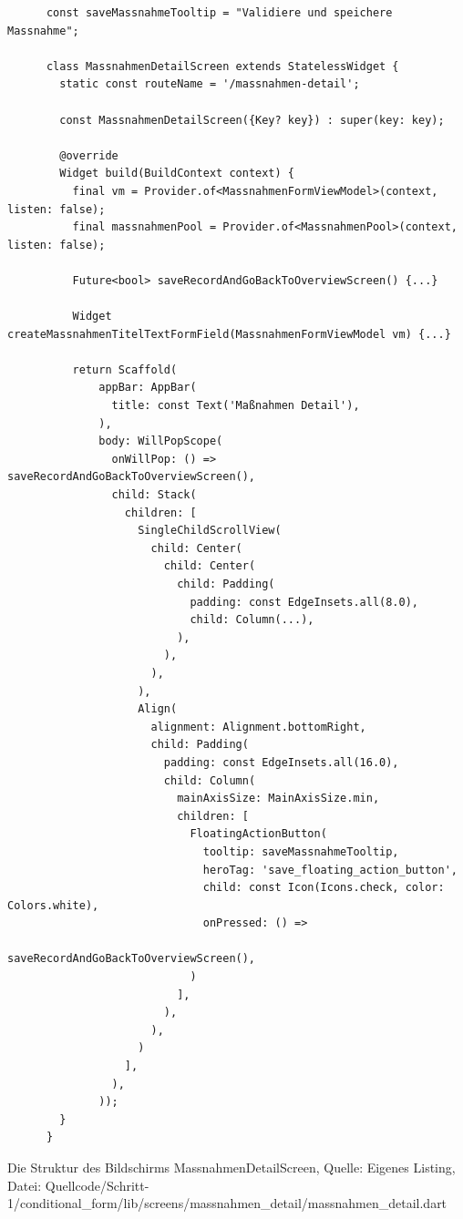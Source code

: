 \begin{listing}[htbp]
    \begin{verbatim}
      const saveMassnahmeTooltip = "Validiere und speichere Massnahme";

      class MassnahmenDetailScreen extends StatelessWidget {
        static const routeName = '/massnahmen-detail';
      
        const MassnahmenDetailScreen({Key? key}) : super(key: key);
      
        @override
        Widget build(BuildContext context) {
          final vm = Provider.of<MassnahmenFormViewModel>(context, listen: false);
          final massnahmenPool = Provider.of<MassnahmenPool>(context, listen: false);
      
          Future<bool> saveRecordAndGoBackToOverviewScreen() {...}
      
          Widget createMassnahmenTitelTextFormField(MassnahmenFormViewModel vm) {...}
      
          return Scaffold(
              appBar: AppBar(
                title: const Text('Maßnahmen Detail'),
              ),
              body: WillPopScope(
                onWillPop: () => saveRecordAndGoBackToOverviewScreen(),
                child: Stack(
                  children: [
                    SingleChildScrollView(
                      child: Center(
                        child: Center(
                          child: Padding(
                            padding: const EdgeInsets.all(8.0),
                            child: Column(...),
                          ),
                        ),
                      ),
                    ),
                    Align(
                      alignment: Alignment.bottomRight,
                      child: Padding(
                        padding: const EdgeInsets.all(16.0),
                        child: Column(
                          mainAxisSize: MainAxisSize.min,
                          children: [
                            FloatingActionButton(
                              tooltip: saveMassnahmeTooltip,
                              heroTag: 'save_floating_action_button',
                              child: const Icon(Icons.check, color: Colors.white),
                              onPressed: () =>
                                  saveRecordAndGoBackToOverviewScreen(),
                            )
                          ],
                        ),
                      ),
                    )
                  ],
                ),
              ));
        }
      }
\end{verbatim}
\caption[Schritt 1 Klasse MassnahmenDetailScreen Struktur]{Die Struktur des Bildschirms MassnahmenDetailScreen, Quelle: Eigenes Listing, Datei: Quellcode/Schritt-1/conditional_form/lib/\newline screens/massnahmen_detail/massnahmen_detail.dart}
\label{lst:Schritt1KlasseMassnahmenDetailScreenStruktur}
\end{listing}


